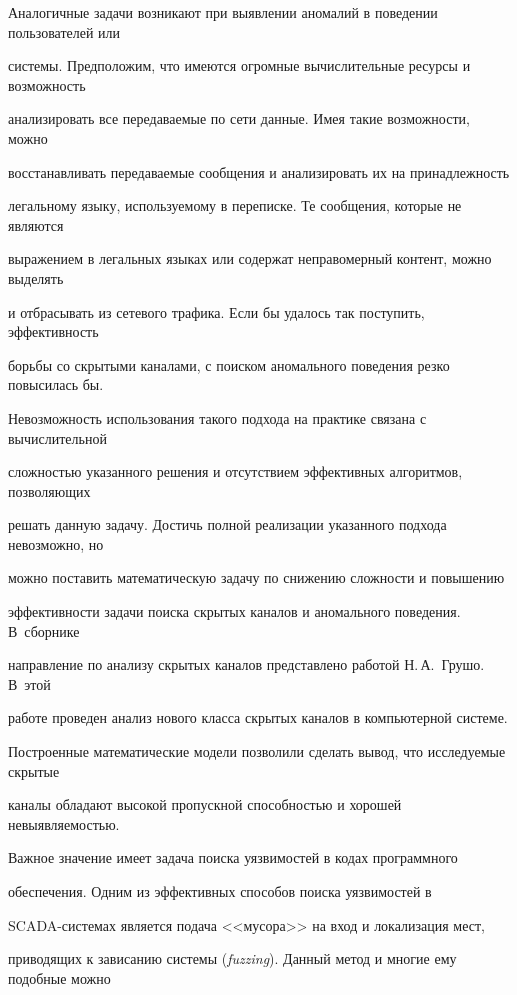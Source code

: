Аналогичные задачи возникают при выявлении аномалий в поведении пользователей или 


системы. Предположим, что имеются огромные вычислительные ресурсы и возможность 


анализировать все передаваемые по сети данные. Имея такие возможности, можно 


восстанавливать передаваемые сообщения и анализировать их на принадлежность 


легальному языку, используемому в переписке. Те сообщения, которые не являются 


выражением в легальных языках или содержат неправомерный контент, можно выделять 


и отбрасывать из сетевого трафика. Если бы удалось так поступить, эффективность 


борьбы со скрытыми каналами, с поиском аномального поведения резко повысилась бы. 


Невозможность использования такого подхода на практике связана с вычислительной 


сложностью указанного решения и отсутствием эффективных алгоритмов, позволяющих 


решать данную задачу. Достичь полной реализации указанного подхода невозможно, но 


можно поставить математическую задачу по снижению слож\-ности и повышению 


эффективности задачи поиска скрытых каналов и аномального поведения. В~сборнике 


направление по анализу скрытых каналов представлено работой Н.\,А.~Грушо. В~этой 


работе проведен анализ нового класса скрытых каналов в компьютерной системе. 


Построенные математические модели позволили сделать вывод, что исследуемые скрытые 


каналы обладают высокой пропускной способностью и хорошей невыявляемостью. 


     


     Важное значение имеет задача поиска уязвимостей в кодах программного 


обеспечения. Одним из эффективных способов поиска уязвимостей в 


     SCADA-сис\-те\-мах является подача <<мусора>> на вход и локализация мест, 


приводящих к зависанию системы (\textit{fuzzing}). Данный метод и многие ему подобные можно 


